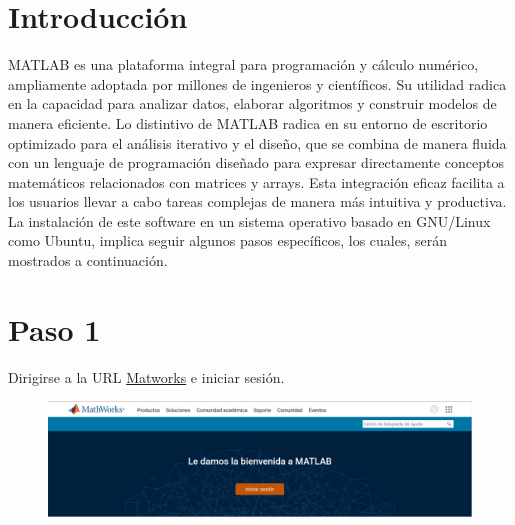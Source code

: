 \documentclass{article}
\begin{document}
\section*{Introducción}

MATLAB es una plataforma integral para programación y cálculo numérico, ampliamente adoptada por millones de ingenieros y científicos. Su utilidad radica en la capacidad para analizar datos, elaborar algoritmos y construir modelos de manera eficiente. Lo distintivo de MATLAB radica en su entorno de escritorio optimizado para el análisis iterativo y el diseño, que se combina de manera fluida con un lenguaje de programación diseñado para expresar directamente conceptos matemáticos relacionados con matrices y arrays. Esta integración eficaz facilita a los usuarios llevar a cabo tareas complejas de manera más intuitiva y productiva.\\

La instalación de este software en un sistema operativo basado en GNU/Linux como Ubuntu, implica seguir algunos pasos específicos, los cuales, serán mostrados a continuación.\\
\section*{Paso 1}
Dirigirse a la URL \href{https://matlab.mathworks.com/}{Matworks} e iniciar sesión.

\begin{figure}[ht]
\centering
\includegraphics[width=1\textwidth]{dos.png}
\end{figure}
\end{document}
